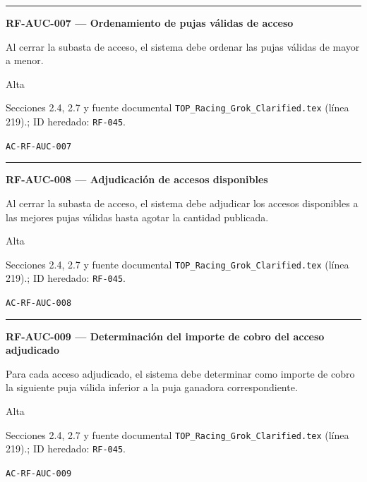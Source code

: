 \documentclass[10pt,letterpaper]{article}
\begin{document}
\vspace{0.25em}\hrule\vspace{0.65em}
\noindent\textbf{RF-AUC-007 --- Ordenamiento de pujas válidas de acceso}\par
\begin{description}[style=nextline,leftmargin=3.15cm,labelwidth=2.8cm,font=\normalfont\bfseries]
\item[Obligación] Al cerrar la subasta de acceso, el sistema debe ordenar las pujas válidas de mayor a menor.
\item[Prioridad] Alta
\item[Procedencia] Secciones 2.4, 2.7 y fuente documental \texttt{TOP\_Racing\_Grok\_Clarified.tex} (línea 219).; ID heredado: \texttt{RF-045}.
\item[Verificación] \texttt{AC-RF-AUC-007}
\end{description}
\vspace{0.25em}\hrule\vspace{0.65em}
\noindent\textbf{RF-AUC-008 --- Adjudicación de accesos disponibles}\par
\begin{description}[style=nextline,leftmargin=3.15cm,labelwidth=2.8cm,font=\normalfont\bfseries]
\item[Obligación] Al cerrar la subasta de acceso, el sistema debe adjudicar los accesos disponibles a las mejores pujas válidas hasta agotar la cantidad publicada.
\item[Prioridad] Alta
\item[Procedencia] Secciones 2.4, 2.7 y fuente documental \texttt{TOP\_Racing\_Grok\_Clarified.tex} (línea 219).; ID heredado: \texttt{RF-045}.
\item[Verificación] \texttt{AC-RF-AUC-008}
\end{description}
\vspace{0.25em}\hrule\vspace{0.65em}
\noindent\textbf{RF-AUC-009 --- Determinación del importe de cobro del acceso adjudicado}\par
\begin{description}[style=nextline,leftmargin=3.15cm,labelwidth=2.8cm,font=\normalfont\bfseries]
\item[Obligación] Para cada acceso adjudicado, el sistema debe determinar como importe de cobro la siguiente puja válida inferior a la puja ganadora correspondiente.
\item[Prioridad] Alta
\item[Procedencia] Secciones 2.4, 2.7 y fuente documental \texttt{TOP\_Racing\_Grok\_Clarified.tex} (línea 219).; ID heredado: \texttt{RF-045}.
\item[Verificación] \texttt{AC-RF-AUC-009}
\end{description}
\end{document}
